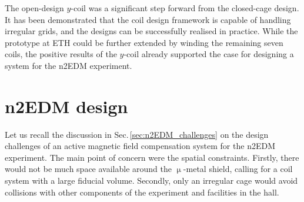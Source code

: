 

The open-design $y$-coil was a significant step forward from the closed-cage design. It has been demonstrated that the coil design framework is capable of handling irregular grids, and the designs can be successfully realised in practice. While the prototype at ETH could be further extended by winding the remaining seven coils, the positive results of the $y$-coil already supported the case for designing a system for the n2EDM experiment.




\section{n2EDM design}
Let us recall the discussion in Sec.\,\ref{sec:n2EDM_challenges} on the design challenges of an active magnetic field compensation system for the n2EDM experiment. The main point of concern were the spatial constraints. Firstly, there would not be much space available around the $\upmu$-metal shield, calling for a coil system with a large fiducial volume. Secondly, only an irregular cage would avoid collisions with other components of the experiment and facilities in the hall.

